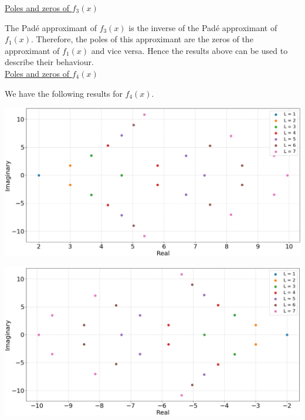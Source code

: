 \documentclass[12pt, a4paper]{article}
\begin{document}
\vspace{0.4cm}
\underline{Poles and zeros of $f_{3}(x)$}

\vspace{0.5cm}
The Pad\'e approximant of $f_{3}(x)$ is the inverse of the Pad\'e approximant of $f_{1}(x)$. Therefore, the
poles of this approximant are the zeros of the approximant of $f_{1}(x)$ and vice versa. Hence the results
above can be used to describe their behaviour.
\\

\vspace{0.4cm}
\underline{Poles and zeros of $f_{4}(x)$}

\vspace{0.5cm}
We have the following results for $f_{4}(x)$.

\vspace{0.3cm}
\begin{minipage}{\textwidth}
	\includegraphics[width=\linewidth]{q5_fig1_poles}
	\label{q5_fig1_poles}
\end{minipage}
\vspace{0.1cm}

\vspace{0.3cm}
\begin{minipage}{\textwidth}
	\includegraphics[width=\linewidth]{q5_fig1_zeros}
	\label{q5_fig1_zeros}
\end{minipage}
\vspace{0.1cm}
\end{document}
